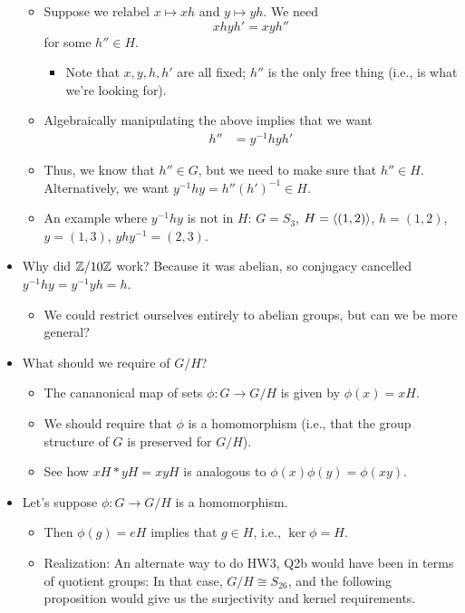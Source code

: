 \documentclass[../notes.tex]{subfiles}
\begin{document}
\begin{itemize}
\begin{itemize}
        \item Suppose we relabel $x\mapsto xh$ and $y\mapsto yh$. We need
        \begin{equation*}
            xhyh' = xyh''
        \end{equation*}
        for some $h''\in H$.
        \begin{itemize}
            \item Note that $x,y,h,h'$ are all fixed; $h''$ is the only free thing (i.e., is what we're looking for).
        \end{itemize}
        \item Algebraically manipulating the above implies that we want
        \begin{align*}
            h'' &= y^{-1}hyh'
        \end{align*}
        \item Thus, we know that $h''\in G$, but we need to make sure that $h''\in H$. Alternatively, we want $y^{-1}hy=h''(h')^{-1}\in H$.
        \item An example where $y^{-1}hy$ is not in $H$: $G=S_3$, $H=\left\langle{(1,2)}\right\rangle$, $h=(1,2)$, $y=(1,3)$, $yhy^{-1}=(2,3)$.
    \end{itemize}
    \item Why did $\mathbb{Z}/10\mathbb{Z}$ work? Because it was abelian, so conjugacy cancelled $y^{-1}hy=y^{-1}yh=h$.
    \begin{itemize}
        \item We could restrict ourselves entirely to abelian groups, but can we be more general?
    \end{itemize}
    \item What should we require of $G/H$?
    \begin{itemize}
        \item The cananonical map of sets $\phi:G\to G/H$ is given by $\phi(x)=xH$.
        \item We should require that $\phi$ is a homomorphism (i.e., that the group structure of $G$ is preserved for $G/H$).
        \item See how $xH*yH=xyH$ is analogous to $\phi(x)\phi(y)=\phi(xy)$.
    \end{itemize}
    \item Let's suppose $\phi:G\to G/H$ is a homomorphism.
    \begin{itemize}
        \item Then $\phi(g)=eH$ implies that $g\in H$, i.e., $\ker\phi=H$.
        \item Realization: An alternate way to do HW3, Q2b would have been in terms of quotient groups: In that case, $G/H\cong S_{26}$, and the following proposition would give us the surjectivity and kernel requirements.

\end{itemize}
\end{itemize}
\end{document}
